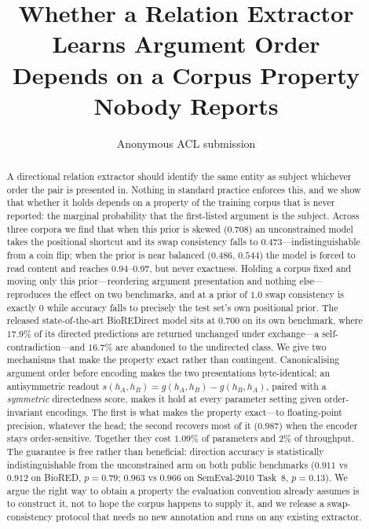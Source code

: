 \documentclass[11pt]{article}
\title{Whether a Relation Extractor Learns Argument Order\\
Depends on a Corpus Property Nobody Reports}
\author{Anonymous ACL submission}
\begin{document}
\maketitle

\begin{abstract}
A directional relation extractor should identify the same entity as subject whichever order the
pair is presented in. Nothing in standard practice enforces this, and we show that whether it
holds depends on a property of the training corpus that is never reported: the marginal
probability that the first-listed argument is the subject. Across three corpora we find that
when this prior is skewed ($0.708$) an unconstrained model takes the positional shortcut and
its swap consistency falls to $0.473$---indistinguishable from a coin flip; when the prior is near balanced ($0.486$,
$0.544$) the model is forced to read content and reaches $0.94$--$0.97$, but never exactness.
Holding a corpus fixed and moving only this prior---reordering argument presentation and
nothing else---reproduces the effect on two benchmarks, and at a prior of $1.0$ swap
consistency is exactly $0$ while accuracy falls to precisely the test set's own positional
prior. The released state-of-the-art BioREDirect model sits at $0.700$ on its own benchmark,
where
$17.9\%$ of its directed predictions are returned unchanged under exchange---a
self-contradiction---and $16.7\%$ are abandoned to the undirected class.
We give two mechanisms that make the property exact rather than contingent. Canonicalising
argument order before encoding makes the two presentations byte-identical; an antisymmetric
readout $s(h_A,h_B) = g(h_A,h_B) - g(h_B,h_A)$, paired with a \emph{symmetric} directedness
score, makes it hold at every parameter setting given order-invariant encodings. The first is
what makes the property exact---to floating-point precision, whatever the head; the second
recovers most of it ($0.987$) when the encoder stays order-sensitive. Together they cost
$1.09\%$ of parameters and $2\%$ of throughput.
The guarantee is free rather than beneficial: direction accuracy is statistically
indistinguishable from the unconstrained arm on both public benchmarks
($0.911$ vs $0.912$ on BioRED, $p=0.79$; $0.963$ vs $0.966$ on
SemEval-2010 Task~8, $p=0.13$). We argue the right
way to obtain a property the evaluation convention already assumes is to construct it, not to
hope the corpus happens to supply it, and we release a swap-consistency protocol that needs no
new annotation and runs on any existing extractor.
\end{abstract}
\end{document}

